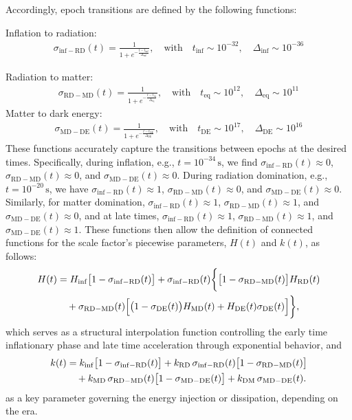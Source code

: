 \documentclass[12pt]{article}  %
\def\bea{\begin{eqnarray}}
\def\eea{\end{eqnarray}}
\begin{document}
Accordingly, epoch transitions are defined by the following functions:

Inflation to radiation:
\bea
\sigma_{\mathrm{inf-RD}}(t) = \frac{1}{1 + e^{-\frac{t - t_{\mathrm{inf}}}{\Delta_{\mathrm{inf}}}}}, \quad \text{with} \quad t_{\mathrm{inf}} \sim 10^{-32}, \quad \Delta_{\mathrm{inf}} \sim 10^{-36}
\eea

Radiation to matter:
\bea
\sigma_{\mathrm{RD-MD}}(t) = \frac{1}{1 + e^{-\frac{t - t_{\mathrm{eq}}}{\Delta_{\mathrm{eq}}}}}, \quad \text{with} \quad t_{\mathrm{eq}} \sim 10^{12}, \quad \Delta_{\mathrm{eq}} \sim 10^{11}
\eea
Matter to dark energy:
\bea
\sigma_{\mathrm{MD-DE}}(t) = \frac{1}{1 + e^{-\frac{t - t_{\mathrm{DE}}}{\Delta_{\mathrm{DE}}}}}, \quad \text{with} \quad t_{\mathrm{DE}} \sim 10^{17}, \quad \Delta_{\mathrm{DE}} \sim 10^{16}
\eea
These functions accurately capture the transitions between epochs at the desired times. Specifically, during inflation, e.g., $t=10^{-34}\,\mathrm{s}$, we find $\sigma_{\mathrm{inf-RD}}(t) \approx 0$, $\sigma_{\mathrm{RD-MD}}(t) \approx 0$, and \(\sigma_{\mathrm{MD-DE}}(t) \approx 0\). During radiation domination, e.g., \(t=10^{-20}\,\mathrm{s}\), we have \(\sigma_{\mathrm{inf-RD}}(t) \approx 1\), \(\sigma_{\mathrm{RD-MD}}(t) \approx 0\), and \(\sigma_{\mathrm{MD-DE}}(t) \approx 0\). Similarly, for matter domination, \(\sigma_{\mathrm{inf-RD}}(t) \approx 1\), \(\sigma_{\mathrm{RD-MD}}(t) \approx 1\), and \(\sigma_{\mathrm{MD-DE}}(t) \approx 0\), and at late times, \(\sigma_{\mathrm{inf-RD}}(t) \approx 1\), \(\sigma_{\mathrm{RD-MD}}(t) \approx 1\), and \(\sigma_{\mathrm{MD-DE}}(t) \approx 1\). These functions then allow the definition of connected functions for the scale factor's piecewise parameters, \(H(t)\) and \(k(t)\), as follows: 
\begin{align}
	H(t) &= H_{\mathrm{inf}} \bigl[1 - \sigma_{\mathrm{inf-RD}}(t)\bigr] 
	+ \sigma_{\mathrm{inf-RD}}(t) \biggl\{ 
	\bigl[1 - \sigma_{\mathrm{RD-MD}}(t)\bigr] H_{\mathrm{RD}}(t) \notag \\
	&\quad + \sigma_{\mathrm{RD-MD}}(t) \Big[ \bigl(1 - \sigma_{\mathrm{DE}}(t)\bigr) H_{\mathrm{MD}}(t) 	+ H_{\mathrm{DE}}(t) \sigma_{\mathrm{DE}}(t) \Big]
	\biggr\},
	\label{eq:H}
\end{align}
which serves as a structural interpolation function controlling the early time inflationary phase and late time acceleration through exponential behavior, and
 \begin{align}
	k(t) &= k_{\mathrm{inf}} \bigl[1 - \sigma_{\mathrm{inf-RD}}(t)\bigr] 
	+ k_{\mathrm{RD}}\, \sigma_{\mathrm{inf-RD}}(t) \bigl[1 - \sigma_{\mathrm{RD-MD}}(t)\bigr] \notag \\
	&\quad + k_{\mathrm{MD}}\, \sigma_{\mathrm{RD-MD}}(t) \bigl[1 - \sigma_{\mathrm{MD-DE}}(t)\bigr] 
	+ k_{\mathrm{DM}}\, \sigma_{\mathrm{MD-DE}}(t).
	\label{eq:k}
\end{align}
as a key parameter governing the energy injection or dissipation, depending on the era.
\end{document}
